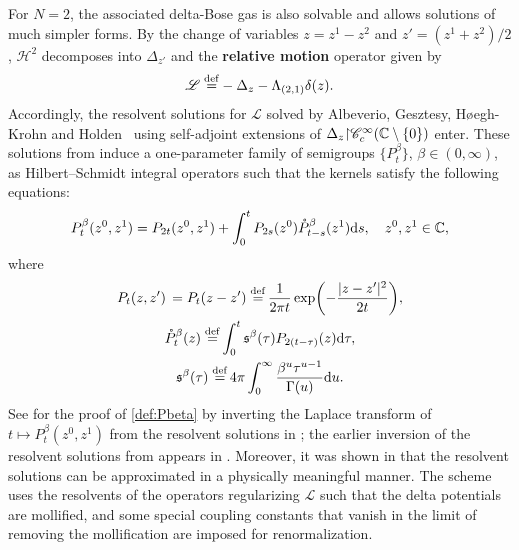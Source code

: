 \documentclass[12pt, twoside]{article}
\numberwithin{figure}{section}
\newcommand{\1}{\mathds 1}
\newcommand{\C}{{\mathscr C}}
\newcommand{\rest}{{\upharpoonright}}
\newcommand{\ms}{\mathscr}
\renewcommand{\d}{{\mathrm d}}
\newcommand{\2}{{\mathbf 1}}
\newcommand{\s}{{\mathfrak s}}
\newcommand{\defeq}{{\stackrel{\rm def}{=}}}
\begin{document}
For $N=2$, the associated delta-Bose gas is also solvable and allows solutions of much simpler forms. 
By the change of variables $z=z^1-z^2$ and $z'=(z^1+z^2)/2$, $\ms H^2$ decomposes into $\Delta_{z'}$ and the {\bf relative motion} operator given by
\begin{align}\label{def:L}
\ms L\;\defeq-\Delta_z-\Lambda_{(2,1)}\delta(z).
\end{align}
Accordingly, the resolvent solutions for $\ms L$ solved by Albeverio, Gesztesy, H\o{}egh-Krohn and Holden~\cite{AGHH:2D} using self-adjoint extensions of $\Delta_z\rest \C_c^\infty(\Bbb C\setminus\{0\})$ enter. These solutions from \cite{AGHH:2D} induce a one-parameter family of semigroups $\{P^\beta_t\}$, $\beta\in (0,\infty)$, as Hilbert--Schmidt integral operators such that the kernels satisfy the following equations:
\begin{align}\label{def:Pbeta}
P^{\beta}_t(z^0,z^1)=P_{2t}(z^0,z^1)+\int_0^t  P_{2s}(z^0)\mathring{P}^\beta_{t-s}(z^1)\d s,\quad z^0,z^1\in \Bbb C,
\end{align}
where 
\begin{gather}
P_{t}(z,z')\,=P_{t}(z-z')\;\defeq\,
\frac{1}{2\pi t}\exp \biggl(- \frac{ |z-z'| ^{2}}{2t} \biggr),\label{def:Pt} \\
\mathring{P}^\beta_t(z)\;\defeq \int_0^t \s^\beta(\tau)P_{2(t-\tau)}(z)\d \tau ,\\
 \s^\beta(\tau)\;\defeq\, 4\pi \int_0^\infty \frac{\beta^u\tau^{u-1}}{\Gamma(u)}\d u.\label{def:sbeta}
\end{gather}
See \cite[Proposition~5.1]{C:DBG} for the proof of \eqref{def:Pbeta} by inverting the Laplace transform of $t\mapsto P^\beta_t(z^0,z^1)$ from the resolvent solutions in \cite{AGHH:2D}; the earlier inversion of the resolvent solutions from \cite{AGHH:2D} appears in \cite[Section~3.2]{ABD:95}. Moreover, it was shown in \cite{AGHH:2D} that the resolvent solutions can be approximated in a physically meaningful manner. The scheme uses the resolvents of the operators regularizing $\ms L$ such that the delta potentials are mollified, and some special coupling constants that vanish in the limit of removing the mollification are imposed for renormalization.  
\end{document}
